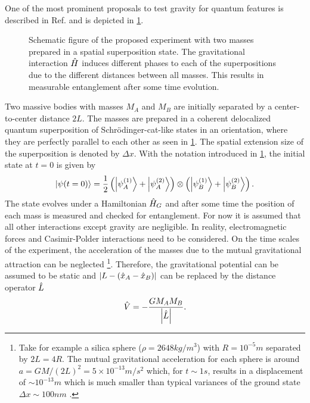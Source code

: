 One of the most prominent proposals to test gravity for quantum features is described in Ref. \cite{Bose_2017} and is depicted in \cref{fig:2:simple-problem}.
\begin{figure}[!htbp]
  \centering
  \def\svgwidth{\textwidth}
  
  \caption{Schematic figure of the proposed experiment with two masses prepared in a spatial superposition state. The gravitational interaction $\hat{H}$ induces different phases to each of the superpositions due to the different distances between all masses. This results in measurable entanglement after some time evolution.}
  \label{fig:2:simple-problem}
\end{figure}
Two massive bodies with masses $M_A$ and $M_B$ are initially separated by a center-to-center distance $2L$. 
The masses are prepared in a coherent delocalized quantum superposition of Schrödinger-cat-like states in an orientation, where they are perfectly parallel to each other as seen in \cref{fig:2:simple-problem}.
The spatial extension size of the superposition is denoted by $\Delta x$.
With the notation introduced in \cref{fig:2:simple-problem}, the initial state at $t=0$ is given by
\begin{equation}\label{eq:2:initial-state}
  \ket{\psi(t=0)} = \frac{1}{2}\left( \ket{\psi_A^{(1)}} + \ket{\psi_A^{(2)}} \right) \otimes \left( \ket{\psi_B^{(1)}} + \ket{\psi_B^{(2)}} \right) .
\end{equation}
The state evolves under a Hamiltonian $\hat{H}_G$ and after some time the position of each mass is measured and checked for entanglement.
For now it is assumed that all other interactions except gravity are negligible. In reality, electromagnetic forces and Casimir-Polder interactions \cite{Casimir_1948, Casimir_1948a} need to be considered.
On the time scales of the experiment, the acceleration of the masses due to the mutual gravitational attraction can be neglected \footnote{Take for example a silica sphere ($\rho = 2648 \si{kg/m^3}$) with $R=10^{-5}\si{m}$ separated by $2L=4R$. The mutual gravitational acceleration for each sphere is around $a=GM/(2L)^2 = 5 \times 10^{-13}\si{m/s^2}$ which, for $t\sim 1 \si{s}$, results in a displacement of $\sim 10^{-13}\si{m}$ which is much smaller than typical variances of the ground state $\Delta x \sim 100\si{nm}$ \cite{Fein_2019}.}.
Therefore, the gravitational potential can be assumed to be static and $\left\lvert L-(\hat{x}_A - \hat{x}_B)\right\rvert$ can be replaced by the distance operator $\hat{L}$
\begin{equation}\label{eq:2:newtonian-potential}
  \hat{V} = -\frac{G M_A M_B}{\left\lvert\hat{L}\right\rvert} .
\end{equation}
